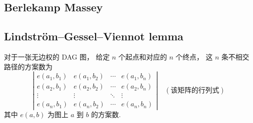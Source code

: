 \subsection{Berlekamp Massey}


\subsection{Lindström–Gessel–Viennot lemma}
对于一张无边权的 DAG 图，
给定 $n$ 个起点和对应的 $n$ 个终点，
这 $n$ 条不相交路径的方案数为
\[
\left|
\begin{array}{cccc}
e(a_1, b_1) & e(a_1, b_2) & \cdots & e(a_1, b_n) \\
e(a_2, b_1) & e(a_2, b_2) & \cdots & e(a_2, b_n) \\
\vdots & \vdots & \ddots & \vdots \\
e(a_n, b_1) & e(a_n, b_2) & \cdots & e(a_n, b_n)
\end{array}
\right|
\quad (\text{该矩阵的行列式})
\]
其中 $e(a,b)$ 为图上 $a$ 到 $b$ 的方案数.
